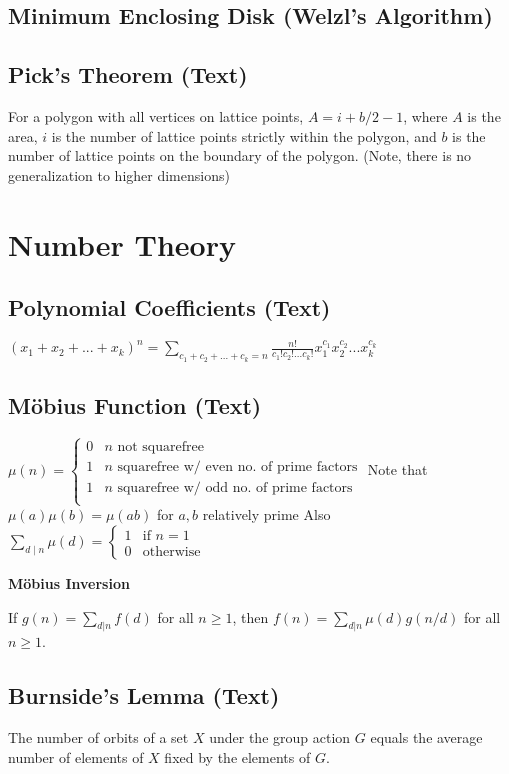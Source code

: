 \documentclass[9pt]{extarticle}
\begin{document}
\begin{multicols}{3}
\subsection{Minimum Enclosing Disk (Welzl's Algorithm)}


\subsection{Pick's Theorem (Text)}

For a polygon with all vertices on lattice points, $A = i + b/2 - 1$, where $A$ is the area, $i$ is the number of lattice points strictly within the polygon, and $b$ is the number of lattice points on the boundary of the polygon. (Note, there is no generalization to higher dimensions)

\section{Number Theory}
\subsection{Polynomial Coefficients (Text)}
$(x_1 + x_2 + ... + x_k)^n = \sum_{c_1 + c_2 + ... + c_k = n} \frac{n!}{c_1! c_2! ... c_k!} x_1^{c_1} x_2^{c_2} ... x_k^{c_k}$

\subsection{M\"obius Function (Text)}
$\mu(n) = \begin{cases}
0 & \text{$n$ not squarefree} \\
1 & \text{$n$ squarefree w/ even no. of prime factors} \\
1 & \text{$n$ squarefree w/ odd no. of prime factors} \\
\end{cases}$
Note that $\mu(a) \mu(b) = \mu(ab)$ for $a, b$ relatively prime
Also $\sum_{d \mid n} \mu(d) = \begin{cases} 1 & \text{if $n = 1$} \\ 0 & \text{otherwise} \end{cases}$

\textbf{M\"obius Inversion}

If $g(n) = \sum_{d|n} f(d)$ for all $n \ge 1$, then $f(n) = \sum_{d|n} \mu(d)g(n/d)$ for all $n \ge 1$.

\subsection{Burnside's Lemma (Text)}
The number of orbits of a set $X$ under the group action $G$ equals the average number of elements of $X$ fixed by the elements of $G$.


\end{multicols}
\end{document}
